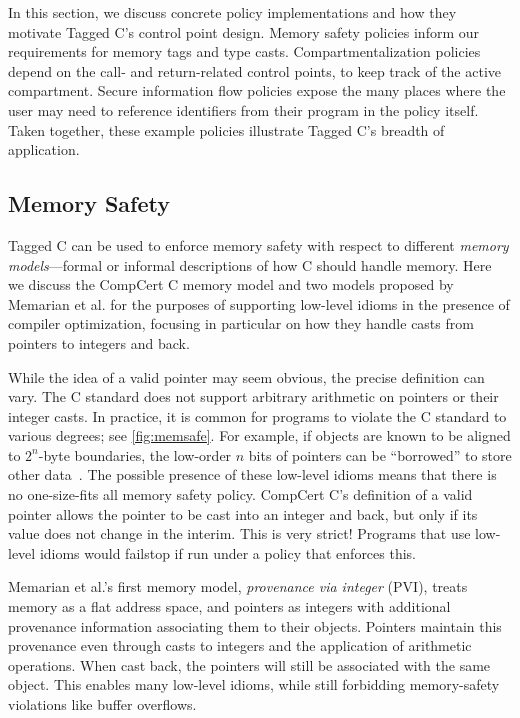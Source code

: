 \documentclass{llncs}
\begin{document}
In this section, we discuss concrete policy implementations and how 
they motivate Tagged C's control point design. Memory safety policies
inform our requirements for memory tags and type casts. Compartmentalization
policies depend on the call- and return-related control points, to keep track of the
active compartment. Secure information flow policies expose the many places
where the user may need to reference identifiers from their program in the policy itself.
Taken together, these example policies illustrate Tagged C's breadth of application.

\subsection{Memory Safety}
\label{sec:memsafe}

Tagged C can be used to enforce memory safety with respect to different {\em memory models}---formal
or informal descriptions of how C should handle memory. Here we discuss the CompCert C
memory model and two models proposed by Memarian et al. \cite{Memarian19:ExploringCSemantics}
for the purposes of supporting low-level idioms in the presence of compiler optimization, focusing in particular on how they handle
casts from pointers to integers and back.

While the idea of a valid pointer may seem obvious, the precise definition can vary. The C standard
does not support arbitrary arithmetic on pointers or their integer casts.  In practice, it is common for programs to violate the
C standard to various degrees; see \cref{fig:memsafe}. For example, if objects are known to be aligned to \(2^n\)-byte boundaries,
the low-order \(n\) bits of pointers can be ``borrowed'' to store other data~\cite{Memarian16:DeFacto}.
The possible presence of these low-level idioms means that there is no one-size-fits all memory safety policy.
CompCert C's definition of a valid pointer allows the pointer to be cast into an integer and back, but only if its value
does not change in the interim. This is very strict! Programs that use low-level idioms
would failstop if run under a policy that enforces this.

Memarian et al.'s first memory model, {\em provenance via integer} (PVI), treats memory
as a flat address space, and pointers as integers with additional provenance information
associating them to their objects. Pointers maintain this provenance even through casts to
integers and the application of arithmetic operations. When cast back, the pointers will still
be associated with the same object. This enables many low-level idioms, while still forbidding
memory-safety violations like buffer overflows.
\end{document}
